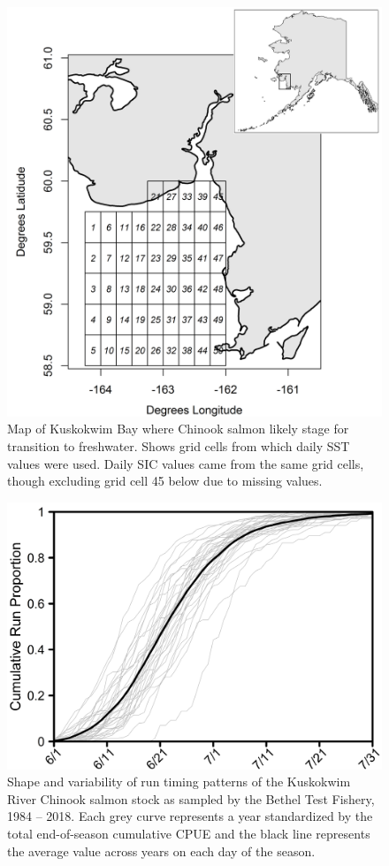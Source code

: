 \documentclass[12pt,]{book}
\theoremstyle{definition}
\theoremstyle{definition}
\theoremstyle{definition}
\theoremstyle{remark}
\begin{document}
\clearpage

\begin{figure}
  \centering
  \includegraphics{img/Ch2/map.png}
  \caption{Map of Kuskokwim Bay where Chinook salmon likely stage for transition to freshwater. Shows grid cells from which daily SST values were used. Daily SIC values came from the same grid cells, though excluding grid cell 45 below due to missing values.}
  \label{fig:ch2-map}
\end{figure}

\clearpage

\begin{figure}
  \centering
  \includegraphics{img/Ch2/p-ccpue.png}
  \caption{Shape and variability of run timing patterns of the Kuskokwim River Chinook salmon stock as sampled by the Bethel Test Fishery, 1984 -- 2018. Each grey curve represents a year standardized by the total end-of-season cumulative CPUE and the black line represents the average value across years on each day of the season.}
  \label{fig:p-ccpue}
\end{figure}
\end{document}
